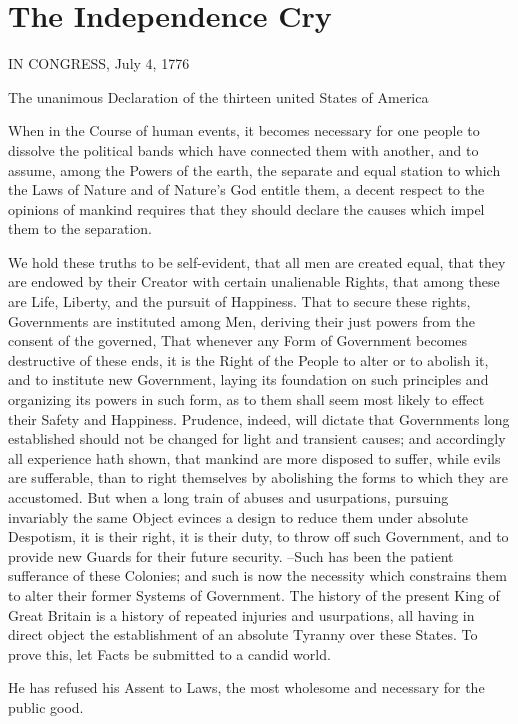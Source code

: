\documentclass{article}
\begin{document}
\section{The Independence Cry}

IN CONGRESS, July 4, 1776

The unanimous Declaration of the thirteen united States of America



When in the Course of human events, it becomes necessary for
one people to dissolve the political bands which have connected
them with another, and to assume, among the Powers of the earth,
the separate and equal station to which the Laws of Nature and
of Nature's God entitle them, a decent respect to the opinions
of mankind requires that they should declare the causes which
impel them to the separation.

We hold these truths to be self-evident, that all men are created equal,
that they are endowed by their Creator with certain unalienable Rights,
that among these are Life, Liberty, and the pursuit of Happiness.
That to secure these rights, Governments are instituted among Men,
deriving their just powers from the consent of the governed,
That whenever any Form of Government becomes destructive of these ends,
it is the Right of the People to alter or to abolish it, and to institute
new Government, laying its foundation on such principles and organizing
its powers in such form, as to them shall seem most likely to effect
their Safety and Happiness.  Prudence, indeed, will dictate that Governments
long established should not be changed for light and transient causes;
and accordingly all experience hath shown, that mankind are more disposed
to suffer, while evils are sufferable, than to right themselves by abolishing
the forms to which they are accustomed.  But when a long train of abuses and
usurpations, pursuing invariably the same Object evinces a design to reduce
them under absolute Despotism, it is their right, it is their duty, to throw
off such Government, and to provide new Guards for their future security.
--Such has been the patient sufferance of these Colonies; and such is now
the necessity which constrains them to alter their former Systems of Government.
The history of the present King of Great Britain is a history of repeated
injuries and usurpations, all having in direct object the establishment
of an absolute Tyranny over these States.  To prove this, let Facts
be submitted to a candid world.

He has refused his Assent to Laws, the most wholesome and necessary
for the public good.
\end{document}
